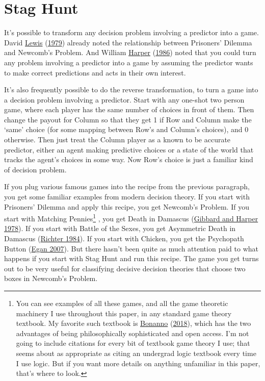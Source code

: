 \documentclass[
  12pt,
]{article}
\begin{document}
\hypertarget{stag-hunt}{%
\section{Stag Hunt}\label{stag-hunt}}

It's possible to transform any decision problem involving a predictor
into a game. David \protect\hyperlink{ref-Lewis1979e}{Lewis}
(\protect\hyperlink{ref-Lewis1979e}{1979}) already noted the
relationship between Prisoners' Dilemma and Newcomb's Problem. And
William \protect\hyperlink{ref-Harper1986}{Harper}
(\protect\hyperlink{ref-Harper1986}{1986}) noted that you could turn any
problem involving a predictor into a game by assuming the predictor
wants to make correct predictions and acts in their own interest.

It's also frequently possible to do the reverse transformation, to turn
a game into a decision problem involving a predictor. Start with any
one-shot two person game, where each player has the same number of
choices in front of them. Then change the payout for Column so that they
get 1 if Row and Column make the `same' choice (for some mapping between
Row's and Column's choices), and 0 otherwise. Then just treat the Column
player as a known to be accurate predictor, either an agent making
predictive choices or a state of the world that tracks the agent's
choices in some way. Now Row's choice is just a familiar kind of
decision problem.

If you plug various famous games into the recipe from the previous
paragraph, you get some familiar examples from modern decision theory.
If you start with Prisoners' Dilemma and apply this recipe, you get
Newcomb's Problem. If you start with Matching Pennies\footnote{You can
  see examples of all these games, and all the game theoretic machinery
  I use throughout this paper, in any standard game theory textbook. My
  favorite such textbook is \protect\hyperlink{ref-Bonanno2018}{Bonanno}
  (\protect\hyperlink{ref-Bonanno2018}{2018}), which has the two
  advantages of being philosophically sophisticated and open access. I'm
  not going to include citations for every bit of textbook game theory I
  use; that seems about as appropriate as citing an undergrad logic
  textbook every time I use logic. But if you want more details on
  anything unfamiliar in this paper, that's where to look.} , you get
Death in Damascus (\protect\hyperlink{ref-GibbardHarper1978}{Gibbard and
Harper 1978}). If you start with Battle of the Sexes, you get Asymmetric
Death in Damascus (\protect\hyperlink{ref-Richter1984}{Richter 1984}).
If you start with Chicken, you get the Psychopath Button
(\protect\hyperlink{ref-Egan2007-EGASCT}{Egan 2007}). But there hasn't
been quite as much attention paid to what happens if you start with Stag
Hunt and run this recipe. The game you get turns out to be very useful
for classifying decisive decision theories that choose two boxes in
Newcomb's Problem.
\end{document}
